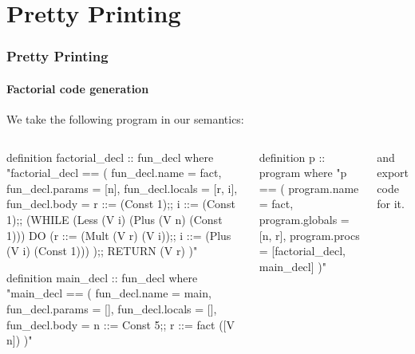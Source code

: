 \section{Pretty Printing}

\begin{frame}[fragile]
\frametitle{Pretty Printing}
\framesubtitle{Factorial code generation}
\Fontvi

We take the following program in our semantics:

\begin{columns}[t]
\begin{semiverbatim}
definition factorial_decl :: fun_decl
  where "factorial_decl ==
    ( fun_decl.name = fact,
      fun_decl.params = [n],
      fun_decl.locals = [r, i],
      fun_decl.body =
        r ::= (Const 1);;
        i ::= (Const 1);;
        (WHILE (Less (V i) (Plus (V n) (Const 1))) DO
          (r ::= (Mult (V r) (V i));;
          i ::= (Plus (V i) (Const 1)))
        );;
        RETURN (V r)
    )"

definition main_decl :: fun_decl
  where "main_decl ==
    ( fun_decl.name = main,
      fun_decl.params = [],
      fun_decl.locals = [],
      fun_decl.body =
        n ::= Const 5;;
        r ::= fact ([V n])
    )"
\end{semiverbatim}
\begin{semiverbatim}
definition p :: program
  where "p ==
    ( program.name = fact,
      program.globals = [n, r],
      program.procs = [factorial_decl, main_decl]
    )"
\end{semiverbatim}

and export code for it.
\end{columns}


\end{frame}


